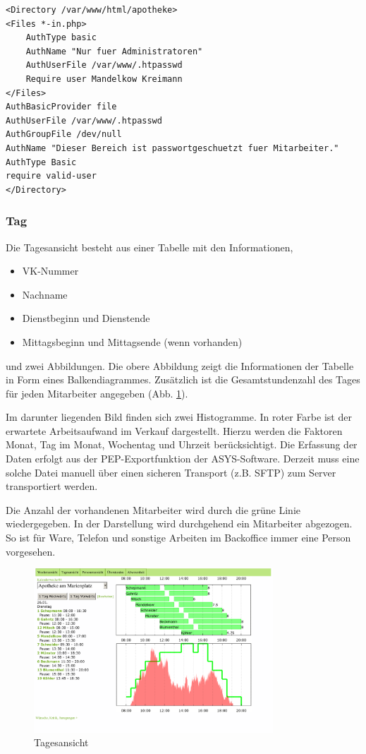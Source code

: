 \documentclass[10pt,a4paper,titlepage,oneside]{article}
\begin{document}
\begin{verbatim}
<Directory /var/www/html/apotheke>
<Files *-in.php>
    AuthType basic
    AuthName "Nur fuer Administratoren"
    AuthUserFile /var/www/.htpasswd
    Require user Mandelkow Kreimann
</Files>
AuthBasicProvider file
AuthUserFile /var/www/.htpasswd
AuthGroupFile /dev/null
AuthName "Dieser Bereich ist passwortgeschuetzt fuer Mitarbeiter."
AuthType Basic
require valid-user
</Directory>
\end{verbatim}





\subsubsection{Tag}
Die Tagesansicht besteht aus einer Tabelle mit den Informationen,
\begin{itemize}
	\item VK-Nummer
	\item Nachname
	\item Dienstbeginn und Dienstende
	\item Mittagsbeginn und Mittagsende (wenn vorhanden)
\end{itemize} 
und zwei Abbildungen. Die obere Abbildung zeigt die Informationen der Tabelle in Form eines Balkendiagrammes. Zusätzlich ist die Gesamtstundenzahl des Tages für jeden Mitarbeiter angegeben (Abb. \ref{fig:Tagesansicht}). 

Im darunter liegenden Bild finden sich zwei Histogramme. In roter Farbe ist der erwartete Arbeitsaufwand im Verkauf dargestellt. Hierzu werden die Faktoren Monat, Tag im Monat, Wochentag und Uhrzeit berücksichtigt. Die Erfassung der Daten erfolgt aus der PEP-Exportfunktion der ASYS-Software. Derzeit muss eine solche Datei manuell über einen sicheren Transport (z.B. SFTP) zum Server transportiert werden.

Die Anzahl der vorhandenen Mitarbeiter wird durch die grüne Linie wiedergegeben. In der Darstellung wird durchgehend ein Mitarbeiter abgezogen. So ist für Ware, Telefon und sonstige Arbeiten im Backoffice immer eine Person vorgesehen.
\begin{figure}[h]
\centering
\includegraphics[width=0.8\textwidth]{tag-out}
\caption{Tagesansicht}
\label{fig:Tagesansicht}
\end{figure}
\end{document}
